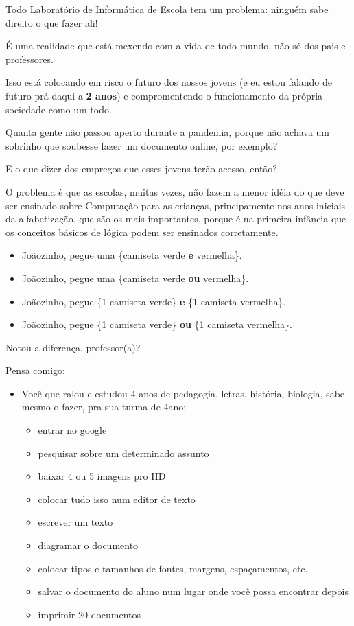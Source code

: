 \large \begin{multicols}{2}
Todo Laboratório de Informática de Escola tem um problema: ninguém sabe direito o que fazer ali!

É uma realidade que está mexendo com a vida de todo mundo, não só dos pais e professores.

Isso está colocando em risco o futuro dos nossos jovens (e eu estou falando de futuro prá daqui a \textbf{2 anos}) e compromentendo o funcionamento da própria sociedade como um todo.

Quanta gente não passou aperto durante a pandemia, porque não achava um sobrinho que soubesse fazer um documento online, por exemplo?

E o que dizer dos empregos que esses jovens terão acesso, então?

O problema é que as escolas, muitas vezes, não fazem a menor idéia do que deve ser ensinado sobre Computação para as crianças, principamente nos anos iniciais da alfabetização, que são os mais importantes, porque é na primeira infância que os conceitos básicos de lógica podem ser ensinados corretamente.

\begin{itemize}
\item Joãozinho, pegue uma \{camiseta verde \textbf{e} vermelha\}.

\item Joãozinho, pegue uma \{camiseta verde \textbf{ou} vermelha\}.

	\item Joãozinho, pegue \{1 camiseta verde\} \textbf{e} \{1 camiseta vermelha\}.
	
		\item Joãozinho, pegue \{1 camiseta verde\} \textbf{ou} \{1 camiseta vermelha\}.
\end{itemize}

Notou a diferença, professor(a)?

Pensa comigo:

\begin{itemize}
	\item Você que ralou e estudou 4 anos de pedagogia, letras, história, biologia, sabe mesmo o fazer, pra sua turma de 4\textordmasculine\space ano:

		\begin{itemize}
			\normalsize
		\item entrar no google
	\item pesquisar sobre um determinado assunto
	\item baixar 4 ou 5 imagens pro HD
	\item colocar tudo isso num editor de texto
	\item escrever um texto
	\item diagramar o documento
	\item colocar tipos e tamanhos de fontes, margens, espaçamentos, etc.
	\item salvar o documento do aluno num lugar onde você possa encontrar depois
	\item imprimir 20 documentos
	\end{itemize}
\end{itemize}


\end{multicols}

